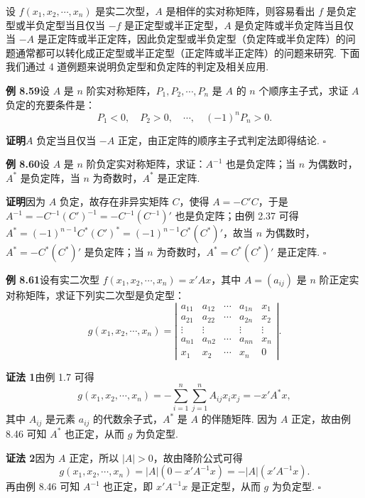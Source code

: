 \documentclass[UTF8, 12pt, fontset=fandol, oneside]{ctexart}
\begin{document}
设 $f(x_1,x_2,\cdots,x_n)$ 是实二次型，$A$ 是相伴的实对称矩阵，则容易看出 $f$ 是负定型或半负定型当且仅当 $-f$ 是正定型或半正定型，$A$ 是负定阵或半负定阵当且仅当 $-A$ 是正定阵或半正定阵，因此负定型或半负定型（负定阵或半负定阵）的问题通常都可以转化成正定型或半正定型（正定阵或半正定阵）的问题来研究. 下面我们通过 4 道例题来说明负定型和负定阵的判定及相关应用.

\noindent\textbf{例 8.59}\quad 设 $A$ 是 $n$ 阶实对称矩阵，$P_1,P_2,\cdots,P_n$ 是 $A$ 的 $n$ 个顺序主子式，求证 $A$ 负定的充要条件是：
\[
P_1<0,\quad P_2>0,\quad \cdots,\quad (-1)^nP_n>0.
\]

\noindent\textbf{证明}\quad $A$ 负定当且仅当 $-A$ 正定，由正定阵的顺序主子式判定法即得结论. $\ensuremath{\square}$

\noindent\textbf{例 8.60}\quad 设 $A$ 是 $n$ 阶负定实对称矩阵，求证：$A^{-1}$ 也是负定阵；当 $n$ 为偶数时，$A^*$ 是负定阵，当 $n$ 为奇数时，$A^*$ 是正定阵.

\noindent\textbf{证明}\quad 因为 $A$ 负定，故存在非异实矩阵 $C$，使得 $A=-C'C$，于是 $A^{-1}=-C^{-1}(C')^{-1}=-C^{-1}(C^{-1})'$ 也是负定阵；由例 2.37 可得 $A^*=(-1)^{n-1}C^*(C')^*=(-1)^{n-1}C^*(C^*)'$，故当 $n$ 为偶数时，$A^*=-C^*(C^*)'$ 是负定阵；当 $n$ 为奇数时，$A^*=C^*(C^*)'$ 是正定阵. $\ensuremath{\square}$

\noindent\textbf{例 8.61}\quad 设有实二次型 $f(x_1,x_2,\cdots,x_n)=x'Ax$，其中 $A=(a_{ij})$ 是 $n$ 阶正定实对称矩阵，求证下列实二次型是负定型：
\[
g(x_1,x_2,\cdots,x_n)=
\left|\begin{array}{ccccc}
a_{11} & a_{12} & \cdots & a_{1n} & x_1\\
a_{21} & a_{22} & \cdots & a_{2n} & x_2\\
\vdots & \vdots &        & \vdots & \vdots\\
a_{n1} & a_{n2} & \cdots & a_{nn} & x_n\\
x_1 & x_2 & \cdots & x_n & 0
\end{array}\right|.
\]

\noindent\textbf{证法 1}\quad 由例 1.7 可得
\[
g(x_1,x_2,\cdots,x_n)=-\sum_{i=1}^n\sum_{j=1}^n A_{ij}x_ix_j=-x'A^*x,
\]
其中 $A_{ij}$ 是元素 $a_{ij}$ 的代数余子式，$A^*$ 是 $A$ 的伴随矩阵. 因为 $A$ 正定，故由例 8.46 可知 $A^*$ 也正定，从而 $g$ 为负定型.

\noindent\textbf{证法 2}\quad 因为 $A$ 正定，所以 $|A|>0$，故由降阶公式可得
\[
g(x_1,x_2,\cdots,x_n)=|A|(0-x'A^{-1}x)=-|A|(x'A^{-1}x).
\]
再由例 8.46 可知 $A^{-1}$ 也正定，即 $x'A^{-1}x$ 是正定型，从而 $g$ 为负定型. $\ensuremath{\square}$
\end{document}
